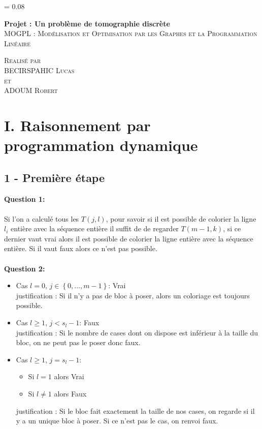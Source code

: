 \documentclass[a4paper]{memoir}
\newlength{\drop}
\newcommand*{\titleM}{\begingroup %
\drop = 0.08\textheight
\centering
\vspace*{\drop}

{\Huge\bfseries Projet : Un problème de tomographie discrète}\\[\baselineskip]

{\large\scshape MOGPL : Modélisation et Optimisation par les Graphes et la Programmation Linéaire}\\[\baselineskip]

\begin{vplace}[0.7]
    \textit{}
\end{vplace}

{\scshape Realisé par\\ BECIRSPAHIC Lucas\\ et\\ ADOUM Robert}\par

\vspace*{2\drop}
\endgroup}
\begin{document}
    \begin{center}
    \titleM 
    \end{center}
    \clearpage
    
    \begin{center}
    \tableofcontents
    \end{center}
    
    \newpage
    
    \section{I. Raisonnement par programmation dynamique}
    \subsection{1 - Première étape}
    \textbf{Question 1:}\\\\ Si l’on a calculé tous les $T(j, l)$, pour savoir si il est possible de colorier la ligne $l_{i}$ entière avec la séquence entière  il suffit de de regarder $T(m-1, k)$, si ce dernier vaut vrai alors il est possible de colorier la ligne entière avec la séquence entière. Si il vaut faux alors ce n'est pas possible.\\\\
    \textbf{Question 2:}
    \begin{itemize}
    \item Cas $l = 0$, $j\in{\left\lbrace 0,...,m-1 \right\rbrace }$: Vrai \\
          justification : Si il n'y a pas de bloc à poser, alors un coloriage est toujours possible.
    \item Cas $l \geqslant 1$, $j < s_{l}-1$: Faux \\
          justification : Si le nombre de cases dont on dispose est inférieur à la taille du bloc, on ne peut pas le poser donc faux. 
	\item Cas $l \geqslant 1$, $j = s_{l}-1$:

		\begin{itemize}
			\item Si $l = 1$ alors Vrai 
			\item Si $l \neq 1$ alors Faux
		\end{itemize}
                justification : Si le bloc fait exactement la taille de nos cases, on regarde si il y a un unique bloc à poser. Si ce n'est pas le cas, on renvoi faux.
    \end{itemize}
 	
\end{document}
